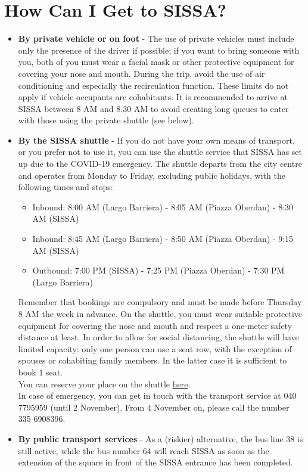 \documentclass{sissavademecum}
\begin{document}
\section{How Can I Get to SISSA?}

\begin{itemize}
	\item \textbf{By private vehicle or on foot} - The use of private vehicles must include only the presence of the driver if possible; if you want to bring someone with you, both of you must wear a facial mask or other protective equipment for covering your nose and mouth. During the trip, avoid the use of air conditioning and especially the recirculation function. These limits do not apply if vehicle occupants are cohabitants. It is recommended to arrive at SISSA between 8 AM and 8.30 AM to avoid creating long queues to enter with those using the private shuttle (see below).
	
	\item \textbf{By the SISSA shuttle} - If you do not have your own means of transport, or you prefer not to use it, you can use the shuttle service that SISSA has set up due to the COVID-19 emergency. The shuttle departs from the city centre and operates from Monday to Friday, excluding public holidays, with the following times and stops:
	\begin{itemize}
		\item Inbound: 8:00 AM (Largo Barriera) - 8:05 AM (Piazza Oberdan) - 8:30 AM (SISSA)
		\item Inbound: 8:45 AM (Largo Barriera) - 8:50 AM (Piazza Oberdan) - 9:15 AM (SISSA)
		\item Outbound: 7:00 PM (SISSA) - 7:25 PM (Piazza Oberdan) - 7:30 PM (Largo Barriera)
	\end{itemize}
	Remember that bookings are compulsory and must be made before Thursday 8 AM the week in advance. On the shuttle, you must wear suitable protective equipment for covering the nose and mouth and respect a one-meter safety distance at least. In order to allow for social distancing, the shuttle will have limited capacity: only one person can use a seat row, with the exception of spouses or cohabiting family members. In the latter case it is sufficient to book 1 seat. \\
	You can reserve your place on the shuttle \href{https://sissa-my.sharepoint.com/:x:/g/personal/tomicich_sissa_it/EQLzW_4F4-lGtuPXJdC9qYgBIXrrV-smwd4T0KILQIp_nw?rtime=GPG4zOFM2Ug}{here}. \\
	In case of emergency, you can get in touch with the transport service at 040 7795959 (until 2 November). From 4 November on, please call the number 335 6908396.
	
	\item \textbf{By public transport services} - As a (riskier) alternative, the bus line 38 is still active, while the bus number 64 will reach SISSA as soon as the extension of the square in front of the SISSA entrance has been completed.
\end{itemize}
\end{document}
